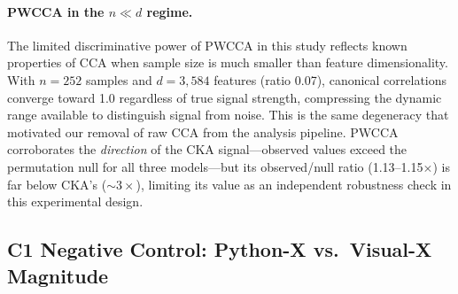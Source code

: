 \begin{table}[h!]
\centering
\small
\caption{Stage A generation summary: validity rate per model and format (3,600 total, 0-shot and 3-shot pooled). Temperature $T{=}0.3$, $n{=}1$ per prompt. (Table~A9)}
\label{tab:stage_a_summary}
\end{table}

\paragraph{PWCCA in the $n \ll d$ regime.}
The limited discriminative power of PWCCA in this study reflects known properties of CCA when sample size is much smaller than feature dimensionality.
With $n{=}252$ samples and $d{=}3{,}584$ features (ratio 0.07), canonical correlations converge toward 1.0 regardless of true signal strength, compressing the dynamic range available to distinguish signal from noise.
This is the same degeneracy that motivated our removal of raw CCA from the analysis pipeline.
PWCCA corroborates the \emph{direction} of the CKA signal---observed values exceed the permutation null for all three models---but its observed/null ratio (1.13--1.15$\times$) is far below CKA's (${\sim}3\times$), limiting its value as an independent robustness check in this experimental design.


\subsection{C1 Negative Control: Python-X vs.\ Visual-X Magnitude}
\label{sec:c1-magnitude}

